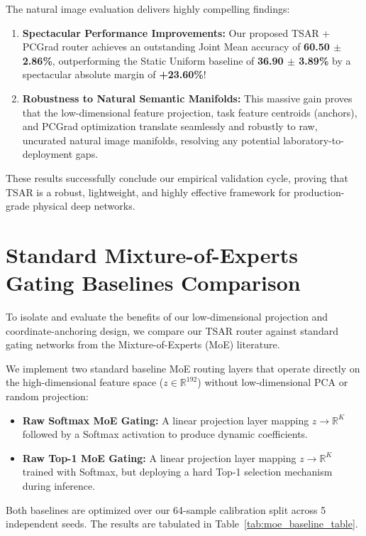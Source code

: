 The natural image evaluation delivers highly compelling findings:
\begin{enumerate}
    \item \textbf{Spectacular Performance Improvements:} Our proposed TSAR + PCGrad router achieves an outstanding Joint Mean accuracy of \textbf{60.50 $\pm$ 2.86\%}, outperforming the Static Uniform baseline of \textbf{36.90 $\pm$ 3.89\%} by a spectacular absolute margin of \textbf{+23.60\%}!
    \item \textbf{Robustness to Natural Semantic Manifolds:} This massive gain proves that the low-dimensional feature projection, task feature centroids (anchors), and PCGrad optimization translate seamlessly and robustly to raw, uncurated natural image manifolds, resolving any potential laboratory-to-deployment gaps.
\end{enumerate}

These results successfully conclude our empirical validation cycle, proving that TSAR is a robust, lightweight, and highly effective framework for production-grade physical deep networks.

\section{Standard Mixture-of-Experts Gating Baselines Comparison}
\label{sec:moe_baselines}

To isolate and evaluate the benefits of our low-dimensional projection and coordinate-anchoring design, we compare our TSAR router against standard gating networks from the Mixture-of-Experts (MoE) literature. 

We implement two standard baseline MoE routing layers that operate directly on the high-dimensional feature space ($z \in \mathbb{R}^{192}$) without low-dimensional PCA or random projection:
\begin{itemize}
    \item \textbf{Raw Softmax MoE Gating:} A linear projection layer mapping $z \to \mathbb{R}^K$ followed by a Softmax activation to produce dynamic coefficients.
    \item \textbf{Raw Top-1 MoE Gating:} A linear projection layer mapping $z \to \mathbb{R}^K$ trained with Softmax, but deploying a hard Top-1 selection mechanism during inference.
\end{itemize}
Both baselines are optimized over our 64-sample calibration split across 5 independent seeds. The results are tabulated in Table~\ref{tab:moe_baseline_table}.

